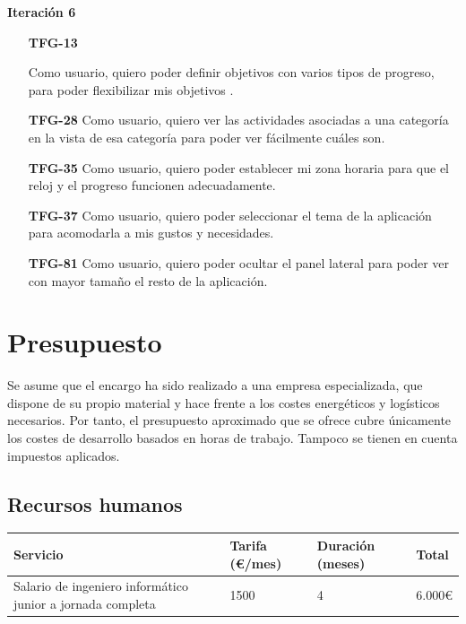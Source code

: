\documentclass[10pt, a4paper]{aqademic}
\begin{document}
\textbf{Iteración 6}
\begin{itemize}[leftmargin=16mm]
	\item [\textbf{TFG-13}]  	
	
	Como usuario, quiero poder definir objetivos con varios tipos de progreso, para poder flexibilizar mis objetivos .
	
	\item [\textbf{TFG-28}] Como usuario, quiero ver las actividades asociadas a una categoría en la vista de esa categoría para poder ver fácilmente cuáles son.
	
	\item [\textbf{TFG-35}] Como usuario, quiero poder establecer mi zona horaria para que el reloj y el progreso funcionen adecuadamente.
	
	\item [\textbf{TFG-37}] Como usuario, quiero poder seleccionar el tema de la aplicación para acomodarla a mis gustos y necesidades.
	
	\item [\textbf{TFG-81}] Como usuario, quiero poder ocultar el panel lateral para poder ver con mayor tamaño el resto de la aplicación.
\end{itemize}


\section{Presupuesto}

Se asume que el encargo ha sido realizado a una empresa especializada, que dispone de su propio material y 
hace frente a los costes energéticos y logísticos necesarios. Por tanto, el presupuesto aproximado que se ofrece cubre únicamente los costes
de desarrollo basados en horas de trabajo. Tampoco se tienen en cuenta impuestos aplicados.

\subsection*{Recursos humanos}

\begin{table}[h!]
	\begin{center}
		\begin{tabular}{|l|l|l|l|}
			\hline
			\rowcolor[HTML]{EFEFEF} 
			\textbf{Servicio}                   & \textbf{Tarifa (€/mes)} & \textbf{Duración (meses)} & \textbf{Total}              \\ \hline
			Salario de ingeniero informático junior a jornada completa & 1500       & 4          & \multicolumn{1}{r|}{6.000€} \\ \hline
		\end{tabular}
	\end{center}
\end{table}
\end{document}
